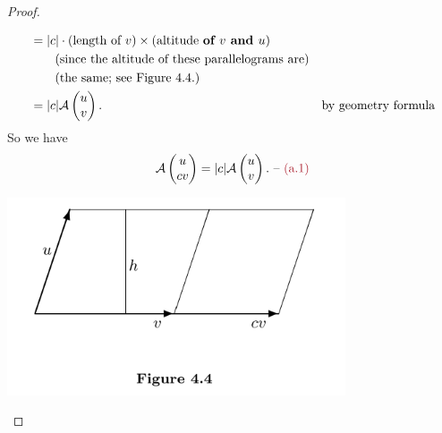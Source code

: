 \begin{proof}
\begin{enumerate}
\begin{align*}
    & = \lvert c\rvert \cdot (\text{length of } v) \times (\text{altitude \textbf{of \(v\) and \(u\)}}) \\
    & \text{\ \ \ \ \ \ (since the altitude of these parallelograms are)} \\
    & \text{\ \ \ \ \ \ (the same; see Figure 4.4.)} \\
    & = \lvert c\rvert \mathcal{A}\begin{pmatrix}
        u \\ v
    \end{pmatrix}. & \text{by geometry formula}
\end{align*}
So we have
\[
    \mathcal{A}\begin{pmatrix}
        u \\ cv
    \end{pmatrix}
    = \abs{c} \mathcal{A}\begin{pmatrix}
        u \\ v
    \end{pmatrix}. \text{ -- \MAROON{(a.1)}}
\]

\includegraphics[width=10cm]{images/figure-4-4.png}


\end{enumerate}
\end{proof}
